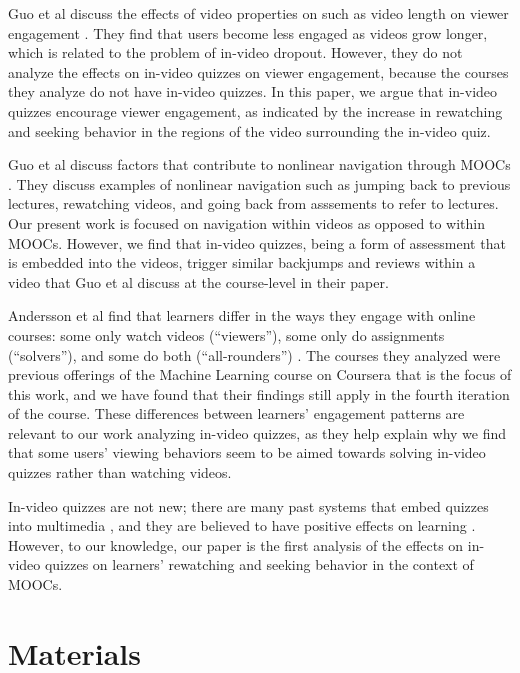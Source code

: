 \documentclass{sigchi}
\begin{document}
Guo et al discuss the effects of video properties on such as video length on viewer engagement \cite{guovideo}. They find that users become less engaged as videos grow longer, which is related to the problem of in-video dropout. However, they do not analyze the effects on in-video quizzes on viewer engagement, because the courses they analyze do not have in-video quizzes. In this paper, we argue that in-video quizzes encourage viewer engagement, as indicated by the increase in rewatching and seeking behavior in the regions of the video surrounding the in-video quiz.

Guo et al discuss factors that contribute to nonlinear navigation through MOOCs \cite{guodemographics}. They discuss examples of nonlinear navigation such as jumping back to previous lectures, rewatching videos, and going back from asssements to refer to lectures. Our present work is focused on navigation within videos as opposed to within MOOCs. However, we find that in-video quizzes, being a form of assessment that is embedded into the videos, trigger similar backjumps and reviews within a video that Guo et al discuss at the course-level in their paper.

Andersson et al find that learners differ in the ways they engage with online courses: some only watch videos (``viewers''), some only do assignments (``solvers''), and some do both (``all-rounders'') \cite{ashton}. The courses they analyzed were previous offerings of the Machine Learning course on Coursera that is the focus of this work, and we have found that their findings still apply in the fourth iteration of the course. These differences between learners' engagement patterns are relevant to our work analyzing in-video quizzes, as they help explain why we find that some users' viewing behaviors seem to be aimed towards solving in-video quizzes rather than watching videos.

In-video quizzes are not new; there are many past systems that embed quizzes into multimedia \cite{multimedia}, and they are believed to have positive effects on learning \cite{embedded}. However, to our knowledge, our paper is the first analysis of the effects on in-video quizzes on learners' rewatching and seeking behavior in the context of MOOCs.

\newpage

\section{Materials}
\end{document}
